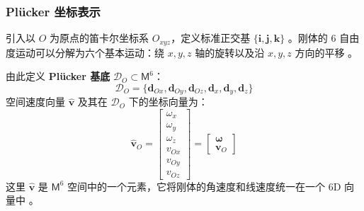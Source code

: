 \subsubsection{Plücker 坐标表示}
引入以 $O$ 为原点的笛卡尔坐标系 $O_{xyz}$，定义标准正交基 $\{\bm{i}, \bm{j}, \bm{k}\}$ 。刚体的 6 自由度运动可以分解为六个基本运动：绕 $x, y, z$ 轴的旋转以及沿 $x, y, z$ 方向的平移 。

由此定义 \textbf{Plücker 基底} $\mathcal{D}_O \subset \mathsf{M}^6$：
\begin{equation}
\mathcal{D}_O = \{ \bm{d}_{Ox}, \bm{d}_{Oy}, \bm{d}_{Oz}, \bm{d}_x, \bm{d}_y, \bm{d}_z \} \tag{2.2}
\end{equation}
空间速度向量 $\hat{\bm{v}}$ 及其在 $\mathcal{D}_O$ 下的坐标向量为：
\begin{equation}
\hat{\bm{v}}_O = \begin{bmatrix} \omega_x \\ \omega_y \\ \omega_z \\ v_{Ox} \\ v_{Oy} \\ v_{Oz} \end{bmatrix} = \begin{bmatrix} \bm{\omega} \\ \bm{v}_O \end{bmatrix} \tag{2.4}
\end{equation}
这里 $\hat{\bm{v}}$ 是 $\mathsf{M}^6$ 空间中的一个元素，它将刚体的角速度和线速度统一在一个 6D 向量中 。



